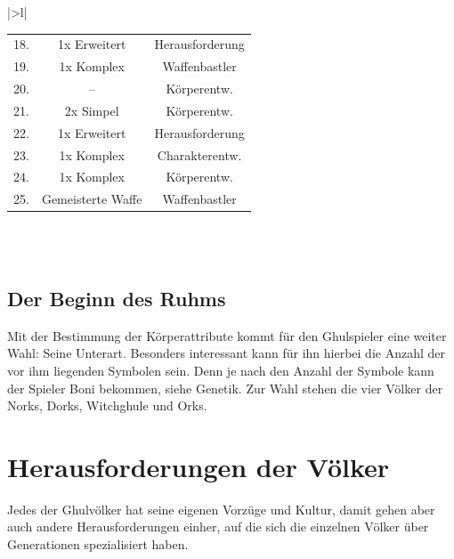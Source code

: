 \begin{table}[h!]
{\begin{tabular}{|>{}l|}
\begin{tabular}{c|c|c}
            \rowcolor{myviolet} 18. & 1x Erweitert & Herausforderung \\
            \rowcolor{myred} 19. & 1x Komplex & Waffenbastler\\
            \rowcolor{myviolet} 20. & -- & Körperentw.\\
            \rowcolor{myred} 21. & 2x Simpel & Körperentw.\\
            \rowcolor{myviolet} 22. & 1x Erweitert & Herausforderung\\
            \rowcolor{myred} 23. & 1x Komplex & Charakterentw.\\
            \rowcolor{myviolet} 24. & 1x Komplex & Körperentw.\\
            \rowcolor{myred} 25. & Gemeisterte Waffe & Waffenbastler \\
        \end{tabular}\\
        \\
        \btrule{1pt}
    \end{tabular}}
\end{table}


\subsection*{Der Beginn des Ruhms}
Mit der Bestimmung der Körperattribute kommt für den Ghulspieler eine weiter Wahl: Seine Unterart. Besonders interessant kann für ihn hierbei die Anzahl der vor ihm liegenden Symbolen sein. Denn je nach den Anzahl der Symbole kann der Spieler Boni bekommen, siehe Genetik. Zur Wahl stehen die vier Völker der Norks, Dorks, Witchghule und Orks.

\section*{Herausforderungen der Völker}
Jedes der Ghulvölker hat seine eigenen Vorzüge und Kultur, damit gehen aber auch andere Herausforderungen einher, auf die sich die einzelnen Völker über Generationen spezialisiert haben.   

